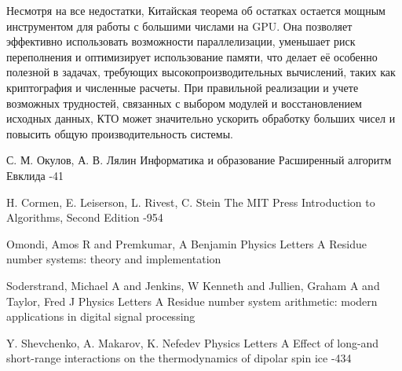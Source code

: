 \documentclass[10pt]{article}
\begin{document}
Несмотря на все недостатки, Китайская теорема об остатках остается мощным инструментом для работы с большими числами на GPU. Она позволяет эффективно использовать возможности параллелизации, уменьшает риск переполнения и оптимизирует использование памяти, что делает её особенно полезной в задачах, требующих высокопроизводительных вычислений, таких как криптография и численные расчеты. При правильной реализации и учете возможных трудностей, связанных с выбором модулей и восстановлением исходных данных, КТО может значительно ускорить обработку больших чисел и повысить общую производительность системы.

\begin{thebibliography}{20}
\setlength{\parsep}{0pt}\setlength{\itemsep}{3pt}

	\by С. М. Окулов, А. В. Лялин
	\jour Информатика и образование
	\paper Расширенный алгоритм Евклида
	-41

\by H. Cormen, E. Leiserson, L. Rivest, C. Stein
\jour The MIT Press 
\paper Introduction to Algorithms, Second Edition
-954


\by Omondi, Amos R and Premkumar, A Benjamin
\jour Physics Letters A
\paper Residue number systems: theory and implementation


\by Soderstrand, Michael A and Jenkins, W Kenneth and Jullien, Graham A and Taylor, Fred J
\jour Physics Letters A
\paper Residue number system arithmetic: modern applications in digital signal processing

\by Y. Shevchenko, A. Makarov, K. Nefedev
\jour Physics Letters A
\paper Effect of long-and short-range interactions on the thermodynamics of dipolar spin ice
-434

\end{thebibliography}



\EndArticle
\end{document}
